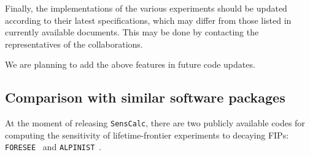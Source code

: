 \documentclass[
    aps,prd,
    twocolumn,
    nofootinbib,
    superscriptaddress,
]{revtex4}
\begin{document}

Finally, the implementations of the various experiments should be updated according to their latest specifications, which may differ from those listed in currently available documents. This may be done by contacting the representatives of the collaborations.

We are planning to add the above features in future code updates.

\subsection{Comparison with similar software packages}
\label{sec:comparison-with-codes}
At the moment of releasing \texttt{SensCalc}, there are two publicly available codes for computing the sensitivity of lifetime-frontier experiments to decaying FIPs: \texttt{FORESEE}~\cite{Kling:2021fwx} and \texttt{ALPINIST}~\cite{Jerhot:2022chi}.
\end{document}
